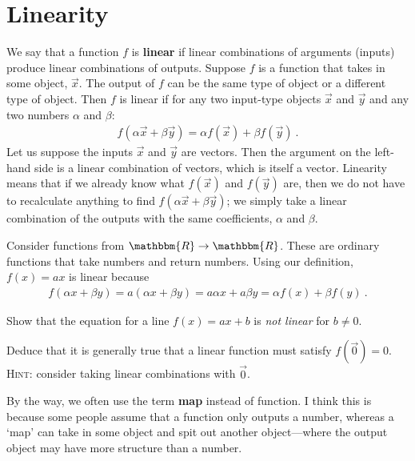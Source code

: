 \section{Linearity}

\begin{bigidea}[Linearity] We say that a function $f$ is \textbf{linear} if linear combinations of arguments (inputs) produce linear combinations of outputs. Suppose $f$ is a function that takes in some object, $\vec{x}$. The output of $f$ can be the same type of object or a different type of object. Then $f$ is linear if for any two input-type objects $\vec{x}$ and $\vec{y}$ and any two numbers $\alpha$ and $\beta$:
\begin{align}
    f(\alpha\vec{x}+ \beta\vec{y}) = \alpha f(\vec{x}) + \beta f(\vec{y}) \ .
    \label{eq:linear:function}
\end{align}
Let us suppose the inputs $\vec{x}$ and $\vec{y}$ are vectors. Then the argument on the left-hand side is a linear combination of vectors, which is itself a vector. Linearity means that if we already know what $f(\vec{x})$ and $f(\vec{y})$ are, then we do not have to recalculate anything to find $f(\alpha\vec{x}+\beta\vec{y})$; we simply take a linear combination of the outputs with the same coefficients, $\alpha$ and $\beta$.
\end{bigidea}

\begin{example}
Consider functions from $\mathbbm{R}\to\mathbbm{R}$. These are ordinary functions that take numbers and return numbers. Using our definition, $f(x) = ax$ is linear because
\begin{align}
    f(\alpha x+\beta y) = a(\alpha x + \beta y)  = a\alpha x + a \beta y =\alpha f(x) + \beta f(y) \ .
\end{align}
\end{example}

\begin{exercise}
Show that the equation for a line $f(x) = ax + b$ is \emph{not linear} for $b\neq 0$.\sidenotemark

Deduce that it is generally true that a linear function must satisfy $f(\vec{0}) = 0$. \textsc{Hint}: consider taking linear combinations with $\vec{0}$.
\end{exercise}

By the way, we often use the term \textbf{map} instead of function. I think this is because some people assume that a function only outputs a number, whereas a `map' can take in some object and spit out another object---where the output object may have more structure than a number.

